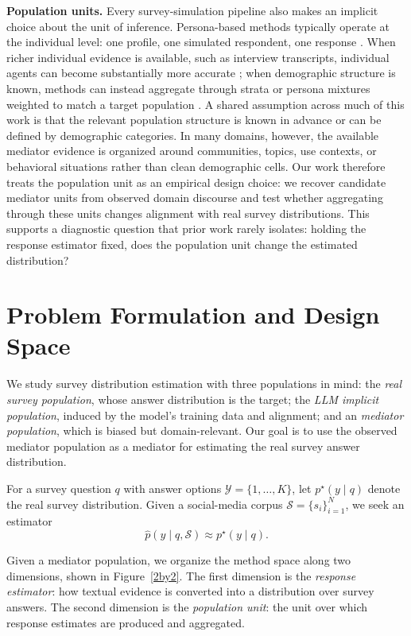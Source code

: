 \documentclass{article}
\begin{document}
\textbf{Population units.}
Every survey-simulation pipeline also makes an implicit choice about the unit of
inference. Persona-based methods typically operate at the individual level: one profile,
one simulated respondent, one response \cite{argyle2023silicon,aher2023using,brand2023llms}.
When richer individual evidence is available, such as interview transcripts, individual
agents can become substantially more accurate \cite{park2024generative}; when demographic
structure is known, methods can instead aggregate through strata or persona mixtures
weighted to match a target population
\cite{gelman1997poststratification,wang2015forecasting,hwang2023aligning,wang2024mixture}.
A shared assumption across much of this work is that the relevant population structure is
known in advance or can be defined by demographic categories. In many domains, however,
the available mediator evidence is organized around communities, topics, use contexts, or
behavioral situations rather than clean demographic cells. Our work therefore treats the
population unit as an empirical design choice: we recover candidate mediator units from
observed domain discourse and test whether aggregating through these units changes
alignment with real survey distributions. This supports a diagnostic question that prior
work rarely isolates: holding the response estimator fixed, does the population unit
change the estimated distribution?

\section{Problem Formulation and Design Space}
\label{sec:problem}

We study survey distribution estimation with three populations in mind:
the \emph{real survey population}, whose answer distribution is the target;
the \emph{LLM implicit population}, induced by the model's training data and alignment;
and an \emph{mediator population}, which is biased but domain-relevant.
Our goal is to use the observed mediator population as a mediator for estimating the real survey answer distribution.

For a survey question $q$ with answer options $\mathcal{Y}=\{1,\ldots,K\}$,
let $p^{\star}(y \mid q)$ denote the real survey distribution.
Given a social-media corpus $\mathcal{S}=\{s_i\}_{i=1}^{N}$,
we seek an estimator
\[
\hat{p}(y \mid q,\mathcal{S}) \approx p^{\star}(y \mid q).
\]

Given a mediator population, we organize the method space along two dimensions, shown in Figure~\ref{2by2}.
The first dimension is the \emph{response estimator}: how textual evidence is converted into a distribution over survey answers.
The second dimension is the \emph{population unit}: the unit over which response estimates are produced and aggregated.
\end{document}
